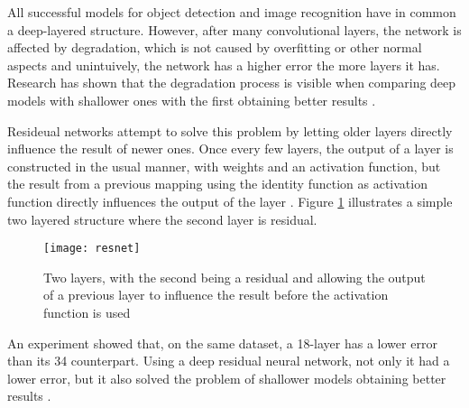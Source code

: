 All successful models for object detection and image recognition have in common a deep-layered structure. However, after many convolutional layers, the network is affected by degradation, which is not caused by overfitting or other normal aspects and unintuively, the network has a higher error the more layers it has. Research has shown that the degradation process is visible when comparing deep models with shallower ones with the first obtaining better results \cite{resnet}.

Resideual networks attempt to solve this problem by letting older layers directly influence the result of newer ones. Once every few layers, the output of a layer is constructed in the usual manner, with weights and an activation function, but the result from a previous mapping using the identity function as activation function directly influences the output of the layer \cite{resnet}. Figure \ref{fig:resnet} illustrates a simple two layered structure where the second layer is residual.

\begin{figure}[b!]
\centering
\texttt{[image: resnet]}
\caption{Two layers, with the second being a residual and allowing the output of a previous layer to influence the result before the activation function is used \cite{resnet}}
\label{fig:resnet}
\end{figure}

An experiment showed that, on the same dataset, a 18-layer has a lower error than its 34 counterpart. Using a deep residual neural network, not only it had a lower error, but it also solved the problem of shallower models obtaining better results \cite{resnet}.


